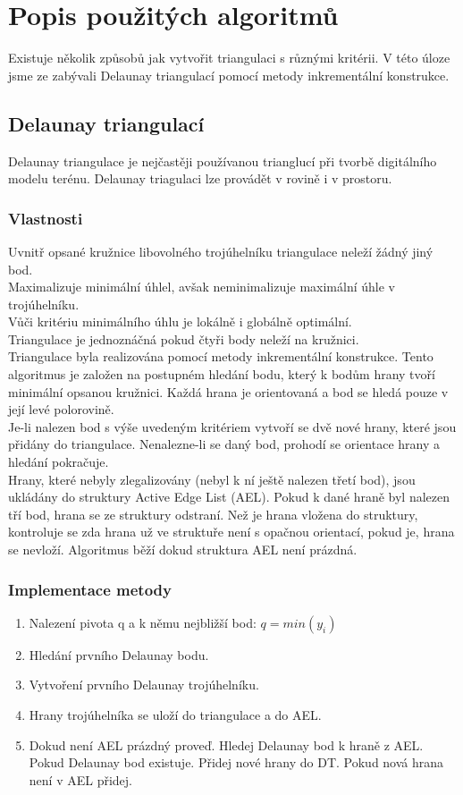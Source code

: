 \documentclass[a4paper, 12pt]{article}
\begin{document}
\section{Popis použitých algoritmů}
Existuje několik způsobů jak vytvořit triangulaci s různými kritérii. V této úloze jsme ze zabývali Delaunay triangulací pomocí metody inkrementální konstrukce.

\subsection{Delaunay triangulací}
Delaunay triangulace je nejčastěji používanou trianglucí při tvorbě digitálního modelu terénu. Delaunay triagulaci lze provádět v rovině i v prostoru.
\\
\subsubsection{Vlastnosti}
Uvnitř opsané kružnice libovolného trojúhelníku triangulace neleží žádný jiný bod.
\\
Maximalizuje minimální úhlel, avšak neminimalizuje maximální úhle v trojúhelníku.
\\
Vůči kritériu minimálního úhlu je lokálně i globálně optimální.
\\
Triangulace je jednoznáčná pokud čtyři body neleží na kružnici.
\\

Triangulace byla realizována pomocí metody inkrementální konstrukce. Tento algoritmus je založen na postupném hledání bodu, který k bodům hrany tvoří minimální opsanou kružnici. Každá hrana je orientovaná a bod se hledá pouze v její levé polorovině.\\
Je-li nalezen bod s výše uvedeným kritériem vytvoří se dvě nové hrany, které jsou přidány do triangulace. Nenalezne-li se daný bod, prohodí se orientace hrany a hledání pokračuje.\\
Hrany, které nebyly zlegalizovány (nebyl k ní ještě nalezen třetí bod), jsou ukládány do struktury Active Edge List (AEL). Pokud k dané hraně byl nalezen tří bod, hrana se ze struktury odstraní. Než je hrana vložena do struktury, kontroluje se zda hrana už ve struktuře není s opačnou orientací, pokud je, hrana se nevloží. Algoritmus běží dokud struktura AEL není prázdná.

\subsubsection{Implementace metody}
\begin{enumerate}
\item Nalezení pivota q a k němu nejbližší bod:  $ q = min(y_i) $ 
\item Hledání prvního Delaunay bodu.
\item Vytvoření prvního Delaunay trojúhelníku.
\item Hrany trojúhelníka se uloží do triangulace a do AEL.
\item Dokud není AEL prázdný proveď.
\subitem Hledej Delaunay bod k hraně z AEL.
\subitem Pokud Delaunay bod existuje.
\subsubitem Přidej nové hrany do DT.
\subsubitem Pokud nová hrana není v AEL přidej.
\end{enumerate}
\end{document}
